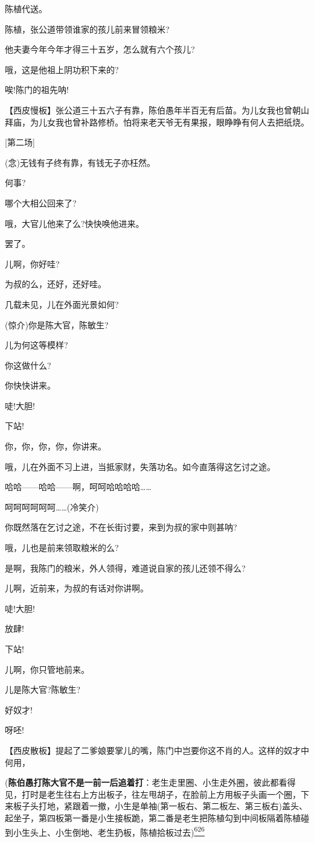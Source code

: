 陈植代送。

陈植，张公道带领谁家的孩儿前来冒领粮米?

他夫妻今年今年才得三十五岁，怎么就有六个孩儿?

哦，这是他祖上阴功积下来的?

唉!陈门的祖先呐!

【西皮慢板】张公道三十五六子有靠，陈伯愚年半百无有后苗。为儿女我也曾朝山拜庙，为儿女我也曾补路修桥。怕将来老天爷无有果报，眼睁睁有何人去把纸烧。

{[}第二场{]}

(念)无钱有子终有靠，有钱无子亦枉然。

何事?

哪个大相公回来了?

哦，大官儿他来了么?快快唤他进来。

罢了。

儿啊，你好哇?

为叔的么，还好，还好哇。

几载未见，儿在外面光景如何?

(惊介)你是陈大官，陈敏生?

儿为何这等模样?

你这做什么?

你快快讲来。

唗!大胆!

下站!

你，你，你，你，你讲来。

哦，儿在外面不习上进，当抵家财，失落功名。如今直落得这乞讨之途。

哈哈------哈哈------啊，呵呵哈哈哈哈\ldots{}\ldots{}

呵呵呵呵呵呵\ldots{}\ldots{}(冷笑介)

你既然落在乞讨之途，不在长街讨要，来到为叔的家中则甚呐?

哦，儿也是前来领取粮米的么?

是啊，我陈门的粮米，外人领得，难道说自家的孩儿还领不得么?

儿啊，近前来，为叔的有话对你讲啊。

唗!大胆!

放肆!

下站!

儿啊，你只管地前来。

儿是陈大官?陈敏生?

好奴才!

呀呸!

【西皮散板】提起了二爹娘要掌儿的嘴，陈门中岂要你这不肖的人。这样的奴才中何用，

(\textbf{陈伯愚打陈大官不是一前一后追着打}：老生走里圈、小生走外圈，彼此都看得见，打时是老生往右上方出板子，往左甩胡子，在脸前上方用板子头画一个圈，下来板子头打地，紧跟着一撤，小生是单袖(第一板右、第二板左、第三板右)盖头、起坐子，第四板第一番是小生接板跪，第二番是老生把陈植勾到中间板隔着陈植碰到小生头上、小生倒地、老生扔板，陈植拾板过去)\protect\hyperlink{fn626}{\textsuperscript{626}}

